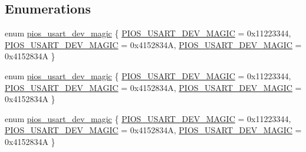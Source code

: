 \subsection*{\-Enumerations}
\begin{DoxyCompactItemize}
\item 
enum \hyperlink{group___p_i_o_s___u_s_a_r_t_gabc5ff4f4da76683608f4140d4e343a32}{pios\-\_\-usart\-\_\-dev\-\_\-magic} \{ \hyperlink{group___p_i_o_s___u_s_a_r_t_ggabc5ff4f4da76683608f4140d4e343a32a58fce3273a001baada6ae6f67f4ce3f7}{\-P\-I\-O\-S\-\_\-\-U\-S\-A\-R\-T\-\_\-\-D\-E\-V\-\_\-\-M\-A\-G\-I\-C} =  0x11223344, 
\hyperlink{group___p_i_o_s___u_s_a_r_t_ggabc5ff4f4da76683608f4140d4e343a32a58fce3273a001baada6ae6f67f4ce3f7}{\-P\-I\-O\-S\-\_\-\-U\-S\-A\-R\-T\-\_\-\-D\-E\-V\-\_\-\-M\-A\-G\-I\-C} =  0x4152834\-A, 
\hyperlink{group___p_i_o_s___u_s_a_r_t_ggabc5ff4f4da76683608f4140d4e343a32a58fce3273a001baada6ae6f67f4ce3f7}{\-P\-I\-O\-S\-\_\-\-U\-S\-A\-R\-T\-\_\-\-D\-E\-V\-\_\-\-M\-A\-G\-I\-C} =  0x4152834\-A
 \}
\item 
enum \hyperlink{group___p_i_o_s___u_s_a_r_t_gabc5ff4f4da76683608f4140d4e343a32}{pios\-\_\-usart\-\_\-dev\-\_\-magic} \{ \hyperlink{group___p_i_o_s___u_s_a_r_t_ggabc5ff4f4da76683608f4140d4e343a32a58fce3273a001baada6ae6f67f4ce3f7}{\-P\-I\-O\-S\-\_\-\-U\-S\-A\-R\-T\-\_\-\-D\-E\-V\-\_\-\-M\-A\-G\-I\-C} =  0x11223344, 
\hyperlink{group___p_i_o_s___u_s_a_r_t_ggabc5ff4f4da76683608f4140d4e343a32a58fce3273a001baada6ae6f67f4ce3f7}{\-P\-I\-O\-S\-\_\-\-U\-S\-A\-R\-T\-\_\-\-D\-E\-V\-\_\-\-M\-A\-G\-I\-C} =  0x4152834\-A, 
\hyperlink{group___p_i_o_s___u_s_a_r_t_ggabc5ff4f4da76683608f4140d4e343a32a58fce3273a001baada6ae6f67f4ce3f7}{\-P\-I\-O\-S\-\_\-\-U\-S\-A\-R\-T\-\_\-\-D\-E\-V\-\_\-\-M\-A\-G\-I\-C} =  0x4152834\-A
 \}
\item 
enum \hyperlink{group___p_i_o_s___u_s_a_r_t_gabc5ff4f4da76683608f4140d4e343a32}{pios\-\_\-usart\-\_\-dev\-\_\-magic} \{ \hyperlink{group___p_i_o_s___u_s_a_r_t_ggabc5ff4f4da76683608f4140d4e343a32a58fce3273a001baada6ae6f67f4ce3f7}{\-P\-I\-O\-S\-\_\-\-U\-S\-A\-R\-T\-\_\-\-D\-E\-V\-\_\-\-M\-A\-G\-I\-C} =  0x11223344, 
\hyperlink{group___p_i_o_s___u_s_a_r_t_ggabc5ff4f4da76683608f4140d4e343a32a58fce3273a001baada6ae6f67f4ce3f7}{\-P\-I\-O\-S\-\_\-\-U\-S\-A\-R\-T\-\_\-\-D\-E\-V\-\_\-\-M\-A\-G\-I\-C} =  0x4152834\-A, 
\hyperlink{group___p_i_o_s___u_s_a_r_t_ggabc5ff4f4da76683608f4140d4e343a32a58fce3273a001baada6ae6f67f4ce3f7}{\-P\-I\-O\-S\-\_\-\-U\-S\-A\-R\-T\-\_\-\-D\-E\-V\-\_\-\-M\-A\-G\-I\-C} =  0x4152834\-A
 \}
\end{DoxyCompactItemize}
